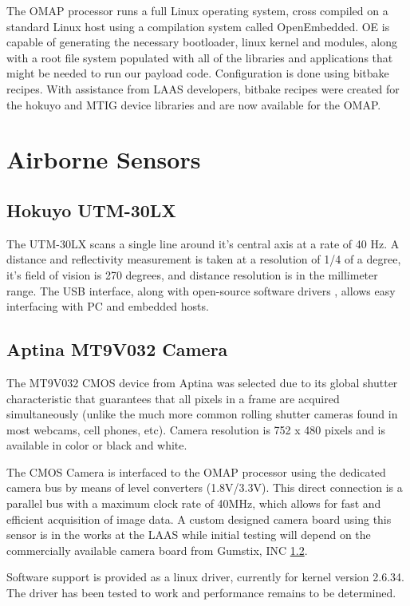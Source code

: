 \documentclass[a4paper,11pt]{report}
\begin{document}
The OMAP processor runs a full Linux operating system, cross compiled on a standard Linux host using a compilation system called OpenEmbedded. OE is capable of generating the necessary bootloader, linux kernel and modules, along with a root file system populated with all of the libraries and applications that might be needed to run our payload code. Configuration is done using bitbake recipes. With assistance from LAAS developers, bitbake recipes were created for the hokuyo and MTIG device libraries and are now available for the OMAP.

\section{Airborne Sensors}

\subsection{Hokuyo UTM-30LX}
\label{Hokuyo}

The UTM-30LX scans a single line around it's central axis at a rate of 40 Hz. A distance and reflectivity measurement is taken at a resolution of 1/4 of a degree, it's field of vision is 270 degrees, and distance resolution is in the millimeter range. The USB interface, along with open-source software drivers \cite{robotpkg}, allows easy interfacing with PC and embedded hosts.

\subsection{Aptina MT9V032 Camera}
\label{caspa}

The MT9V032 CMOS device from Aptina was selected due to its global shutter characteristic that guarantees that all pixels in a frame are acquired simultaneously (unlike the much more common rolling shutter cameras found in most webcams, cell phones, etc). Camera resolution is 752 x 480 pixels and is available in color or black and white. 

The CMOS Camera is interfaced to the OMAP processor using the dedicated camera bus by means of level converters (1.8V/3.3V). This direct connection is a parallel bus with a maximum clock rate of 40MHz, which allows for fast and efficient acquisition of image data. A custom designed camera board using this sensor is in the works at the LAAS while initial testing will depend on the commercially available camera board from Gumstix, INC \ref{caspa}.

Software support is provided as a linux driver, currently for kernel version 2.6.34. The driver has been tested to work and performance remains to be determined.
\end{document}
